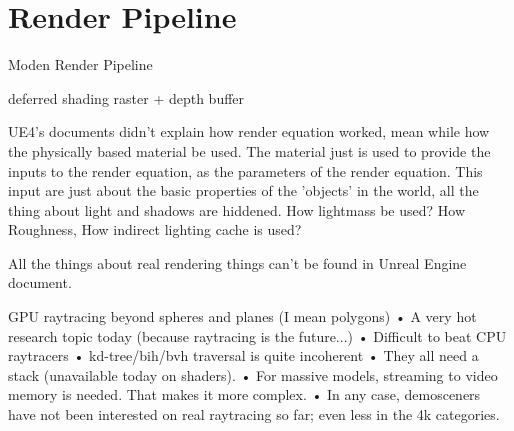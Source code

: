 \chapter{Render Pipeline}

Moden Render Pipeline

deferred shading
raster + depth buffer

UE4's documents didn't explain how render equation worked, mean while how the physically based material be used. The material just is used to provide the inputs to the render equation, as the parameters of the render equation. This input are just about the basic properties of the 'objects' in the world, all the thing about light and shadows are hiddened. How lightmass be used? How Roughness, How indirect lighting cache is used?

All the things about real rendering things can't be found in Unreal Engine document.


GPU raytracing beyond spheres and planes (I mean polygons)
• A very hot research topic today (because raytracing is the future...)
• Difficult to beat CPU raytracers
• kd-tree/bih/bvh traversal is quite incoherent
• They all need a stack (unavailable today on shaders).
• For massive models, streaming to video memory is needed. That makes it more complex.
• In any case, demosceners have not been interested on real raytracing so far; even less in the 4k categories.